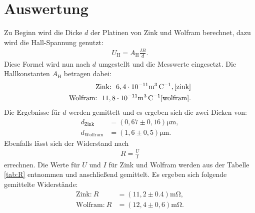 \section{Auswertung}
\label{sec:Auswertung}
Zu Beginn wird die Dicke $d$ der Platinen von Zink und Wolfram
berechnet, dazu wird die Hall-Spannung genutzt:
\begin{align}
U_\mathrm{H}=A_\mathrm{H}\frac{IB}{d}.
\end{align}
Diese Formel wird nun nach $d$ umgestellt und die Messwerte eingesetzt.
Die Hallkonstanten $A_\mathrm{H}$ betragen dabei:
\begin{align*}
  \text{Zink:}\ \ 6,4\cdot10^{-11}\si{\meter\tothe{3}\per\coulomb}, \text{\cite{zink}}\\
  \text{Wolfram:}\ \ 11,8\cdot10^{-11}\si{\meter\tothe{3}\per\coulomb}\text{\cite{wolfram}}.
  \end{align*}
Die Ergebnisse für $d$ werden gemittelt und es ergeben sich die zwei Dicken von:
\begin{align*}
d_\mathrm{Zink}&=(0,67\pm0,16)\si{\micro\meter},\\
d_\mathrm{Wolfram}&=(1,6\pm0,5)\si{\micro\meter}.
\end{align*}
Ebenfalls lässt sich
der Widerstand nach
\begin{align}
  R=\frac{U}{I}
\end{align}
errechnen.
Die Werte für $U$ und $I$ für Zink und Wolfram werden aus der Tabelle \ref{tab:R} entnommen und anschließend gemittelt.
Es ergeben sich folgende gemittelte Widerstände:
\begin{align*}
\text{Zink:} \ R&=(11,2\pm0.4)\si{\milli\ohm},\\
\text{Wolfram:} \ R&=(12,4\pm0,6)\si{\milli\ohm}.
\end{align*}
